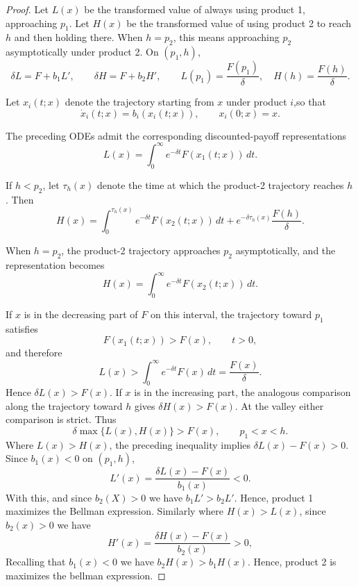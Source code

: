\documentclass[11pt]{article}
\begin{document}
\begin{proof}
Let $L(x)$ be the transformed value of always using product 1, approaching $p_1$. Let $H(x)$ be the transformed value of using product 2 to reach $h$ and then holding there. When $h=p_2$, this means approaching $p_2$ asymptotically under product 2. On $(p_1,h)$,
\begin{equation*}
\delta L=F+b_1L',\qquad \delta H=F+b_2H',
\qquad
L(p_1)=\frac{F(p_1)}{\delta},\quad
H(h)=\frac{F(h)}{\delta}.
\end{equation*}

Let $x_i(t;x)$ denote the trajectory starting from $x$ under product $i$,so that
\begin{equation*}
       \dot{x}_i(t;x)=b_i(x_i(t;x)),
       \qquad
       x_i(0;x)=x.
\end{equation*}

The preceding ODEs admit the corresponding discounted-payoff
representations
\begin{equation*}
       L(x)=\int_0^\infty e^{-\delta t}F(x_1(t;x))\,dt.
\end{equation*}

If $h<p_2$, let $\tau_h(x)$ denote the time at which the product-2 trajectory reaches $h$. Then
\begin{equation*}
       H(x)=\int_0^{\tau_h(x)}e^{-\delta t}F(x_2(t;x))\,dt+e^{-\delta\tau_h(x)}
\frac{F(h)}{\delta}.
\end{equation*}

When $h=p_2$, the product-2 trajectory approaches $p_2$ asymptotically, and the representation becomes
\begin{equation*}
       H(x)=\int_0^\infty e^{-\delta t}F(x_2(t;x))\,dt.
\end{equation*}

If $x$ is in the decreasing part of $F$ on this interval, the trajectory toward $p_1$ satisfies
\begin{equation*}
       F(x_1(t;x))>F(x),\qquad t>0,
\end{equation*}
and therefore
\begin{equation*}
       L(x)>\int_0^\infty e^{-\delta t}F(x)\,dt=\frac{F(x)}{\delta}.
\end{equation*}
Hence $\delta L(x)>F(x)$. If $x$ is in the increasing part, the analogous
comparison along the trajectory toward $h$ gives $\delta H(x)>F(x)$.
At the valley either comparison is strict. Thus
\begin{equation*}
       \delta\max\{L(x),H(x)\}>F(x),\qquad p_1<x<h.
\end{equation*}
Where $L(x)>H(x)$, the preceding inequality implies $\delta L(x)-F(x)>0$. Since $b_1(x)<0$ on $(p_1,h)$,
\begin{equation*}
       L'(x)=\frac{\delta L(x)-F(x)}{b_1(x)}<0.
\end{equation*}
With this, and since $b_2(X)>0$ we have $b_1L'>b_2L'$. Hence, product 1 maximizes the Bellman expression. Similarly  where $H(x)>L(x)$, since $b_2(x)>0$ we have
\begin{equation*}
       H'(x)=\frac{\delta H(x)-F(x)}{b_2(x)}>0,
\end{equation*}
Recalling that $b_1(x)<0$ we have $b_2H(x) >b_1H(x)$. Hence, product 2 is maximizes the bellman expression.


\end{proof}
\end{document}
